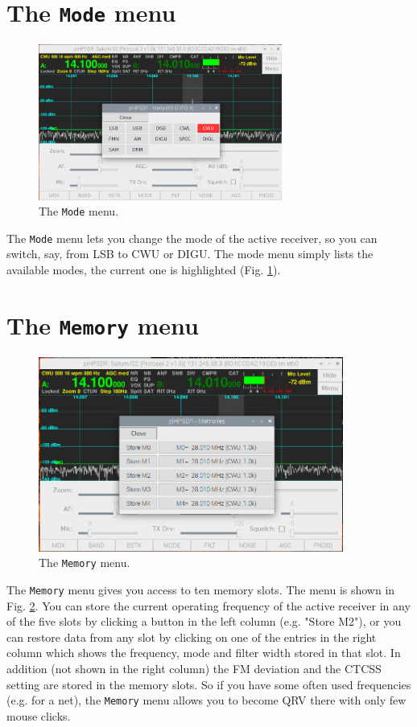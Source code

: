 \documentclass[12pt]{book}
\def\bltt#1{\texttt{\color{blue}#1}}
\begin{document}
\section{The \texttt{Mode} menu}
\begin{figure}[ht]
\center
\includegraphics[width=8cm]{ModeMenu.png}
\caption{The \bltt{Mode} menu.}
\label{fig:ModeMenu}
\end{figure}

The \bltt{Mode} menu lets you change the mode of the active receiver, so you can switch,
say, from LSB to CWU or DIGU. The mode menu simply lists the available modes, the current
one is highlighted (Fig. \ref{fig:ModeMenu}).

\section{The \texttt{Memory}  menu}
\label{sec:memmenu}

 \begin{figure}[ht]
\center
\includegraphics[width=10cm]{MemMenu.png}
\caption{The \bltt{Memory} menu.}
\label{fig:MemMenu}
\end{figure}

The \bltt{Memory} menu gives you access to ten memory slots. The menu is shown in Fig. \ref{fig:MemMenu}.
You can store the current
operating frequency  of the active receiver in any of the five slots by clicking a
button in the left column (e.g. "Store M2"), or you can restore
data from any slot by clicking on one of the entries in the right column
which shows the frequency, mode and filter width stored in that slot.
In addition (not shown in the right column) the FM deviation and the CTCSS setting are stored
in the memory slots.
 So if you have some often used frequencies (e.g. for a net), the
\bltt{Memory} menu allows you to become QRV there with only few mouse clicks.
\end{document}
